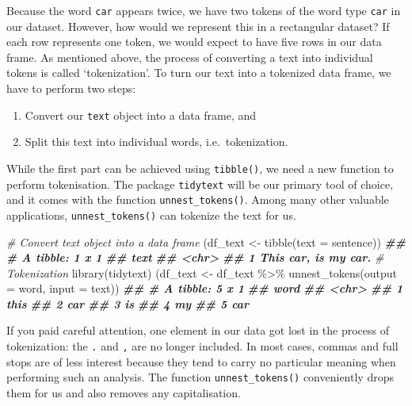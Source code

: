 \documentclass[
]{book}
\newenvironment{Shaded}{\begin{snugshade}}{\end{snugshade}}
\newcommand{\AttributeTok}[1]{\textcolor[rgb]{0.77,0.63,0.00}{#1}}
\newcommand{\CommentTok}[1]{\textcolor[rgb]{0.56,0.35,0.01}{\textit{#1}}}
\newcommand{\DocumentationTok}[1]{\textcolor[rgb]{0.56,0.35,0.01}{\textbf{\textit{#1}}}}
\newcommand{\FunctionTok}[1]{\textcolor[rgb]{0.00,0.00,0.00}{#1}}
\newcommand{\NormalTok}[1]{#1}
\newcommand{\OtherTok}[1]{\textcolor[rgb]{0.56,0.35,0.01}{#1}}
\newcommand{\SpecialCharTok}[1]{\textcolor[rgb]{0.00,0.00,0.00}{#1}}
\providecommand{\tightlist}{%
  \setlength{\itemsep}{0pt}\setlength{\parskip}{0pt}}
\begin{document}
Because the word \texttt{car} appears twice, we have two tokens of the word type \texttt{car} in our dataset. However, how would we represent this in a rectangular dataset? If each row represents one token, we would expect to have five rows in our data frame. As mentioned above, the process of converting a text into individual tokens is called `tokenization'. To turn our text into a tokenized data frame, we have to perform two steps:

\begin{enumerate}
\def\labelenumi{\arabic{enumi}.}
\tightlist
\item
  Convert our \texttt{text} object into a data frame, and
\item
  Split this text into individual words, i.e.~tokenization.
\end{enumerate}

While the first part can be achieved using \texttt{tibble()}, we need a new function to perform tokenisation. The package \texttt{tidytext} will be our primary tool of choice, and it comes with the function \texttt{unnest\_tokens()}. Among many other valuable applications, \texttt{unnest\_tokens()} can tokenize the text for us.

\begin{Shaded}
\begin{Highlighting}[]
\CommentTok{\# Convert text object into a data frame}
\NormalTok{(df\_text }\OtherTok{\textless{}{-}} \FunctionTok{tibble}\NormalTok{(}\AttributeTok{text =}\NormalTok{ sentence))}
\DocumentationTok{\#\# \# A tibble: 1 x 1}
\DocumentationTok{\#\#   text                }
\DocumentationTok{\#\#   \textless{}chr\textgreater{}               }
\DocumentationTok{\#\# 1 This car, is my car.}
\CommentTok{\# Tokenization}
\FunctionTok{library}\NormalTok{(tidytext)}
\NormalTok{(df\_text }\OtherTok{\textless{}{-}}\NormalTok{ df\_text }\SpecialCharTok{\%\textgreater{}\%} \FunctionTok{unnest\_tokens}\NormalTok{(}\AttributeTok{output =}\NormalTok{ word,}
                                      \AttributeTok{input =}\NormalTok{ text))}
\DocumentationTok{\#\# \# A tibble: 5 x 1}
\DocumentationTok{\#\#   word }
\DocumentationTok{\#\#   \textless{}chr\textgreater{}}
\DocumentationTok{\#\# 1 this }
\DocumentationTok{\#\# 2 car  }
\DocumentationTok{\#\# 3 is   }
\DocumentationTok{\#\# 4 my   }
\DocumentationTok{\#\# 5 car}
\end{Highlighting}
\end{Shaded}

If you paid careful attention, one element in our data got lost in the process of tokenization: the \texttt{.} and \texttt{,} are no longer included. In most cases, commas and full stops are of less interest because they tend to carry no particular meaning when performing such an analysis. The function \texttt{unnest\_tokens()} conveniently drops them for us and also removes any capitalisation.
\end{document}
